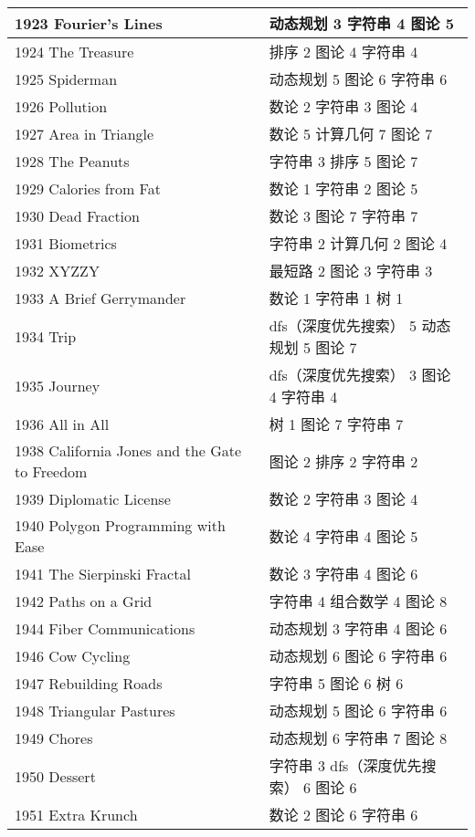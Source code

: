 \begin{longtable}{| p{} | p{} |}
 1923 Fourier's Lines  & 动态规划 3 字符串 4 图论 5 \\ \hline
 1924 The Treasure  & 排序 2 图论 4 字符串 4 \\ \hline
 1925 Spiderman  & 动态规划 5 图论 6 字符串 6 \\ \hline
 1926 Pollution  & 数论 2 字符串 3 图论 4 \\ \hline
 1927 Area in Triangle  & 数论 5 计算几何 7 图论 7 \\ \hline
 1928 The Peanuts  & 字符串 3 排序 5 图论 7 \\ \hline
 1929 Calories from Fat  & 数论 1 字符串 2 图论 5 \\ \hline
 1930 Dead Fraction  & 数论 3 图论 7 字符串 7 \\ \hline
 1931 Biometrics  & 字符串 2 计算几何 2 图论 4 \\ \hline
 1932 XYZZY  & 最短路 2 图论 3 字符串 3 \\ \hline
 1933 A Brief Gerrymander  & 数论 1 字符串 1 树 1 \\ \hline
 1934 Trip  & dfs（深度优先搜索） 5 动态规划 5 图论 7 \\ \hline
 1935 Journey  & dfs（深度优先搜索） 3 图论 4 字符串 4 \\ \hline
 1936 All in All  & 树 1 图论 7 字符串 7 \\ \hline
 1938 California Jones and the Gate to Freedom  & 图论 2 排序 2 字符串 2 \\ \hline
 1939 Diplomatic License  & 数论 2 字符串 3 图论 4 \\ \hline
 1940 Polygon Programming with Ease  & 数论 4 字符串 4 图论 5 \\ \hline
 1941 The Sierpinski Fractal  & 数论 3 字符串 4 图论 6 \\ \hline
 1942 Paths on a Grid  & 字符串 4 组合数学 4 图论 8 \\ \hline
 1944 Fiber Communications  & 动态规划 3 字符串 4 图论 6 \\ \hline
 1946 Cow Cycling  & 动态规划 6 图论 6 字符串 6 \\ \hline
 1947 Rebuilding Roads  & 字符串 5 图论 6 树 6 \\ \hline
 1948 Triangular Pastures  & 动态规划 5 图论 6 字符串 6 \\ \hline
 1949 Chores  & 动态规划 6 字符串 7 图论 8 \\ \hline
 1950 Dessert  & 字符串 3 dfs（深度优先搜索） 6 图论 6 \\ \hline
 1951 Extra Krunch  & 数论 2 图论 6 字符串 6 \\ \hline

\end{longtable}
